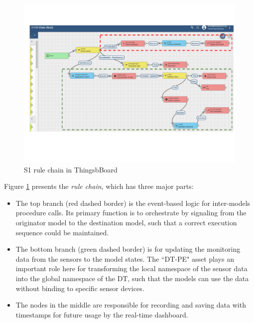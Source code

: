 \begin{figure}[hbt!]
  \centering
  \includegraphics[scale=0.6]{figures/s1_tb_rulechain.pdf}
  \caption{S1 rule chain in ThingsbBoard}
  \label{fig:s1_tb_rulechain}
\end{figure}

Figure \ref{fig:s1_tb_rulechain} presents the \textit{rule chain}, which has three major parts:
\begin{itemize}
\item The top branch (red dashed border) is the event-based logic for inter-models procedure calls. Its primary function is to orchestrate by signaling from the originator model to the destination model, such that a correct execution sequence could be maintained. 
\item The bottom branch (green dashed border) is for updating the monitoring data from the sensors to the model states. The ``DT-PE" asset plays an important role here for transforming the local namespace of the sensor data into the global namespace of the DT, such that the models can use the data without binding to specific sensor devices.
\item The nodes in the middle are responsible for recording and saving data with timestamps for future usage by the real-time dashboard. 
\end{itemize}

